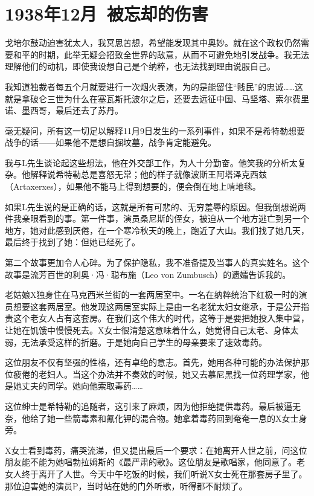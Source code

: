 \documentclass[UTF8]{ctexart}
\begin{document}
\section{1938年12月\ 被忘却的伤害}

戈培尔鼓动迫害犹太人，我冥思苦想，希望能发现其中奥妙。就在这个政权仍然需要和平的时期，此举无疑会招致全世界的敌意，从而不可避免地引发战争。我无法理解他们的动机，即使我设想自己是个纳粹，也无法找到理由说服自己。

我知道独裁者每五个月就要进行一次烟火表演，为的是能留住“贱民”的忠诚……这就是拿破仑三世为什么在塞瓦斯托波尔之后，还要去远征中国、马坚塔、索尔费里诺、墨西哥，最后还去了苏丹。

毫无疑问，所有这一切足以解释11月9日发生的一系列事件，如果不是希特勒想要战争的话——如果他不是想自掘坟墓，战争肯定能避免。

我与L先生谈论起这些想法，他在外交部工作，为人十分勤奋。他笑我的分析太复杂。他解释说希特勒总是喜怒无常；他的样子就像波斯王阿塔泽克西兹（Artaxerxes），如果他不能马上得到想要的，便会倒在地上啃地毯。

如果L先生说的是正确的话，这就是所有可悲的、无穷羞辱的原因。但我倒想说两件我亲眼看到的事。第一件事，演员桑尼斯的侄女，被迫从一个地方逃亡到另一个地方，她对此感到厌倦，在一个寒冷秋天的晚上，跑近了大山。我们找了她几天，最后终于找到了她：但她已经死了。

第二个故事更加令人心碎。为了保护隐私，我不准备提及当事人的真实姓名。这个故事是流芳百世的利奥·冯·聪布施（Leo von Zumbusch）的遗孀告诉我的。

老姑娘X独身住在马克西米兰街的一套两居室中。一名在纳粹统治下红极一时的演员想要这套两居室。他发现这两居室实际上是由一名老犹太妇女继承，于是公开指责这个老女人占有这套房。在我们这个伟大的时代，这等于是要把她投入集中营，让她在饥饿中慢慢死去。X女士很清楚这意味着什么，她觉得自己太老、身体太弱，无法承受这样的折磨。于是她向自己学生的母亲要来了速效毒药。

这位朋友不仅有坚强的性格，还有卓绝的意志。首先，她用各种可能的办法保护那位疲倦的老妇人。当这个办法并不奏效的时候，她又去慕尼黑找一位药理学家，他是她丈夫的同学。她向他索取毒药……

这位绅士是希特勒的追随者，这引来了麻烦，因为他拒绝提供毒药。最后被逼无奈，他给了她一些箭毒素和氰化钾的混合物。她拿着毒药回到奄奄一息的X女士身旁。

X女士看到毒药，痛哭流涕，但又提出最后一个要求：在她离开人世之前，问这位朋友能不能为她唱勃拉姆斯的《最严肃的歌》。这位朋友是歌唱家，他同意了。老女人终于离开了人世。今天中午吃饭的时候，我们听说X女士死在那套房子里了。那位迫害她的演员P，当时站在她的门外听歌，听得都不耐烦了。
\end{document}
